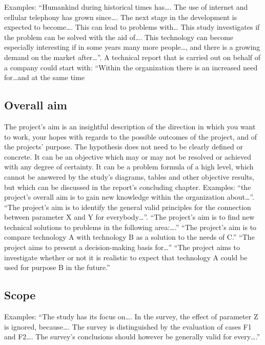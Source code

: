 Examples: ``Humankind during historical times has\dots. The use of internet and
cellular telephony has grown since\dots. The next stage in the development is
expected to become\dots. This can lead to problems with… This study investigates if
the problem can be solved with the aid of\dots. This technology can become
especially interesting if in some years many more people\dots, and there is a
growing demand on the market after\dots''.
A technical report that is carried out on behalf of a company could start with:
“Within the organization there is an increased need for\dots and at the same time

\subsection{Overall aim}\label{subsec:aim}
\noindent
The project's aim is an insightful description of the direction in which you
want to work, your hopes with regards to the possible outcomes of the project,
and of the projects' purpose. The hypothesis does not need to be clearly defined
or concrete. It can be an objective which may or may not be resolved or achieved
with any degree of certainty. It can be a problem formula of a high level, which
cannot be answered by the study's diagrams, tables and other objective results,
but which can be discussed in the report's concluding chapter. Examples: ``the
project's overall aim is to gain new knowledge within the organization
about\dots''.
``The project's aim is to identify the general valid principles for the
connection between parameter X and Y for everybody\dots''. ``The project's aim is to
find new technical solutions to problems in the following area:\dots.'' ``The
project's aim is to compare technology A with technology B as a solution to the
needs of C.'' ``The project aims to present a decision-making basis for\dots''
``The project aims to investigate whether or not it is realistic to expect that
technology A could be used for purpose B in the future.''

\subsection{Scope}\label{subsec:scope}
\noindent
Examples: ``The study has its focus on\dots. In the survey, the effect of parameter Z
is ignored, because…. The survey is distinguished by the evaluation of cases F1
and F2\dots. The survey's conclusions should however be generally valid for
every\dots.''

